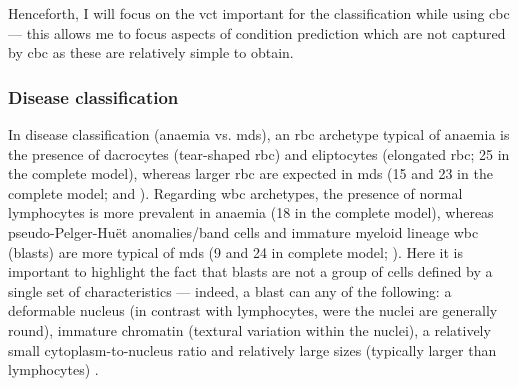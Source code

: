 Henceforth, I will focus on the \ac{vct} important for the classification while using \ac{cbc} --- this allows me to focus aspects of condition prediction which are not captured by \ac{cbc} as these are relatively simple to obtain. 

\subsubsection{Disease classification} 

In disease classification (anaemia vs. \ac{mds}), an \ac{rbc} archetype typical of anaemia is the presence of dacrocytes (tear-shaped \ac{rbc}) and eliptocytes (elongated \ac{rbc}; 25 in the complete model), whereas larger \ac{rbc} are expected in \ac{mds} (15 and 23 in the complete model;  and ). Regarding \ac{wbc} archetypes, the presence of normal lymphocytes is more prevalent in anaemia (18 in the complete model), whereas pseudo-Pelger-Huët anomalies/band cells and immature myeloid lineage \ac{wbc} (blasts) are more typical of \ac{mds} (9 and 24 in complete model; ). Here it is important to highlight the fact that blasts are not a group of cells defined by a single set of characteristics --- indeed, a blast can any of the following: a deformable nucleus (in contrast with lymphocytes, were the nuclei are generally round), immature chromatin (textural variation within the nuclei), a relatively small cytoplasm-to-nucleus ratio and relatively large sizes (typically larger than lymphocytes) \cite{Bain2004-uq,Bain2005-zg,Bain2014-oc}.

\begin{figure}[!ht]
    \label{fig:mile-vice-vcq-so-disease-classification}
\end{figure}

\begin{figure}[!ht]
    \label{fig:rbc-disease-classification-examples}
\end{figure}

